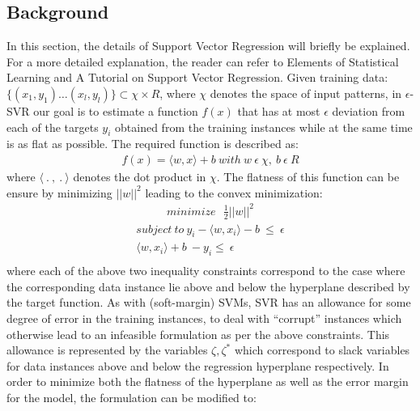 \documentclass[12pt]{article}
\begin{document}
\subsection{Background}
\label{Background} 
In this section, the details of Support Vector Regression will briefly be explained. For a more detailed explanation, the reader can refer to  Elements of Statistical Learning\cite{esl} and A Tutorial on Support Vector Regression\cite{svrtut}.
\newline\newline
 Given training data: $\{(x_{1}, y_{1})\dots(x_{l}, y_{l})\}\subset \chi \times R$, where $\chi$ denotes the space of input patterns, in $\epsilon$-SVR our goal is to estimate a function $f(x)$ that has at most $\epsilon$ deviation from each of the targets $y_{i}$ obtained from the training instances while at the same time is as flat as possible. The required function is described as:  
 \begin{gather*} 
f(x) = \langle w, x\rangle + b \ with\  w\  \epsilon\ \chi, \ b\ \epsilon\ R
 \end{gather*}
 where $\langle\ .\ ,\ .\ \rangle$ denotes the dot product in $\chi$. The flatness of this function can be ensure by minimizing $||w||^2$ leading to the convex minimization:
\belowdisplayskip=0pt
 \begin{gather*} 
minimize\ \ \ \frac{1}{2}||w||^2
\end{gather*}
\begin{align*}
subject\ to\ y_{i} - \langle w, x_{i}\rangle - b\ \leq\ \epsilon\\ 
\langle w, x_{i}\rangle + b\ - y_{i} \leq\ \epsilon\\
 \end{align*}
where each of the above two inequality constraints correspond to the case where the corresponding data instance lie above and below the hyperplane described by the target function.
\newline\newline
As with (soft-margin) SVMs, SVR has an allowance for some degree of error in the training instances, to deal with ``corrupt''  instances which otherwise lead to an infeasible  formulation as per the above constraints. This allowance is represented by the variables $\zeta, \zeta^*$ which correspond to slack variables for data instances above and below the regression hyperplane respectively. 
\newline\newline
 In order to minimize both the flatness of the hyperplane as well as the error margin for the model, the formulation can be modified to:
\end{document}
